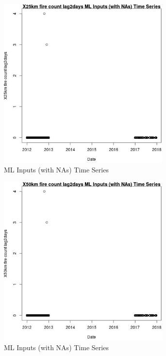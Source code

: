 \begin{figure} 
\centering  
\includegraphics[width=0.77\textwidth]{Code_Outputs/Report_ML_input_PM25_Step4_part_e_de_duplicated_aves_compiled_2019-05-14wNAs_X25km_fire_count_lag2daysvDate.jpg} 
\caption{\label{fig:Report_ML_input_PM25_Step4_part_e_de_duplicated_aves_compiled_2019-05-14wNAsX25km_fire_count_lag2daysvDate}ML Inputs (with NAs) Time Series} 
\end{figure} 
 

\begin{figure} 
\centering  
\includegraphics[width=0.77\textwidth]{Code_Outputs/Report_ML_input_PM25_Step4_part_e_de_duplicated_aves_compiled_2019-05-14wNAs_X50km_fire_count_lag2daysvDate.jpg} 
\caption{\label{fig:Report_ML_input_PM25_Step4_part_e_de_duplicated_aves_compiled_2019-05-14wNAsX50km_fire_count_lag2daysvDate}ML Inputs (with NAs) Time Series} 
\end{figure} 
 

